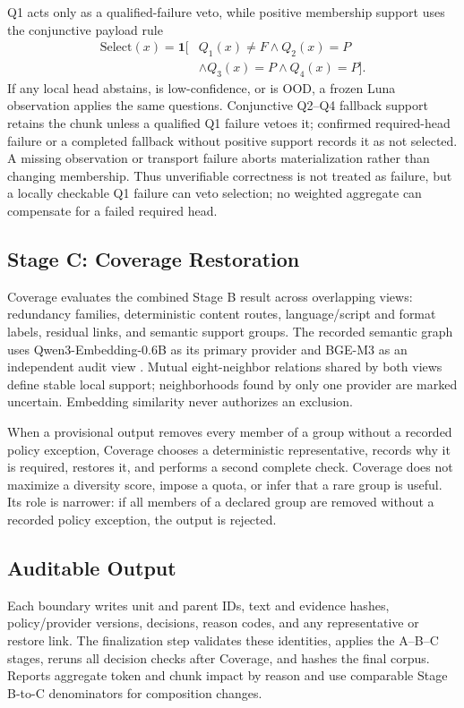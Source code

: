 \documentclass[conference]{IEEEtran}
\begin{document}
Q1 acts only as a qualified-failure veto, while positive membership support uses
the conjunctive payload rule
\begin{equation}
\begin{aligned}
\mathrm{Select}(x)=\mathbf{1}[&Q_1(x)\neq F\land Q_2(x)=P\\
                              &\land Q_3(x)=P\land Q_4(x)=P].
\end{aligned}
\label{eq:selection}
\end{equation}
If any local head abstains, is low-confidence, or is OOD, a frozen Luna
observation applies the same questions. Conjunctive Q2--Q4 fallback support
retains the chunk unless a qualified Q1 failure vetoes it; confirmed required-head
failure or a completed fallback without positive support records it as not selected.
A missing observation or transport failure aborts materialization rather than
changing membership. Thus unverifiable correctness is not treated as failure,
but a locally checkable Q1 failure can veto selection; no weighted aggregate can
compensate for a failed required head.

\subsection{Stage C: Coverage Restoration}
Coverage evaluates the combined Stage B result across overlapping views:
redundancy families, deterministic content routes, language/script and format
labels, residual links, and semantic support groups. The recorded semantic graph
uses Qwen3-Embedding-0.6B as its primary provider and BGE-M3 as an independent
audit view \cite{zhang2025qwen3embedding,chen2024bgem3}. Mutual eight-neighbor
relations shared by both views define stable local support; neighborhoods found
by only one provider are marked uncertain. Embedding similarity never authorizes
an exclusion.

When a provisional output removes every member of a group without a recorded
policy exception, Coverage chooses a deterministic representative, records why
it is required, restores it, and performs a second complete check.
Coverage does not maximize a diversity score, impose a quota, or infer that a
rare group is useful. Its role is narrower: if all members of a declared group
are removed without a recorded policy exception, the output is rejected.

\subsection{Auditable Output}
Each boundary writes unit and parent IDs, text and evidence hashes,
policy/provider versions, decisions, reason codes, and any representative or
restore link. The finalization step validates these identities, applies the
A--B--C stages, reruns all decision checks after Coverage, and hashes the
final corpus. Reports aggregate token and chunk impact by reason and use
comparable Stage B-to-C denominators for composition changes.
\end{document}

